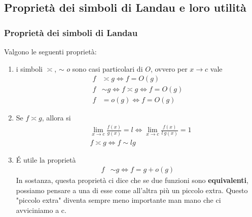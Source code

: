 \documentclass{book}
\begin{document}
\subsection{Proprietà dei simboli di Landau e loro utilità}
\noindent\begin{minipage}{\textwidth}
  \begin{proposition}
    \subsubsection{Proprietà dei simboli di Landau}
    Valgono le seguenti proprietà:
    \begin{enumerate}[label=\roman*., start=1]
      \item i simboli \(\asymp\), \(\sim\) \(o\) sono casi particolari di \(O\), ovvero per \(x \to c\) vale
            \begin{align*}
              f & \asymp g \iff f = O(g)               \\
              f & \sim g \iff f \asymp g \iff f = O(g) \\
              f & = o(g) \iff f = O(g)
            \end{align*}
      \item Se \(f \asymp g\), allora si
            \begin{align*}
               & \lim_{x \to c} \frac{f(x)}{g(x)} = l \iff  \lim_{x \to c} \frac{f(x)}{l\ g(x)} = 1 \\
               & f \asymp g \iff f \sim lg
            \end{align*}
      \item \'E utile la proprietà
            \begin{align*}
              f & \sim g \iff f = g + o(g)
            \end{align*}
            In sostanza, questa proprietà ci dice che se due funzioni sono \textbf{equivalenti}, possiamo pensare a una di esse come all'altra più un piccolo extra. Questo "piccolo extra" diventa sempre meno importante man mano che ci avviciniamo a c.


\end{enumerate}
\end{proposition}
\end{minipage}
\end{document}
